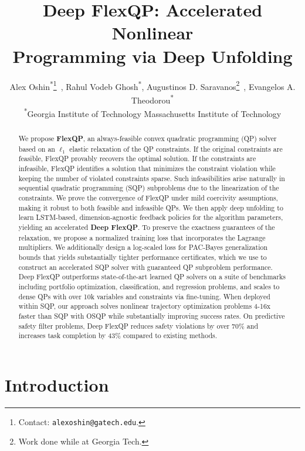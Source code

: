 \documentclass{article} %
\title{Deep FlexQP: Accelerated Nonlinear\\Programming via Deep Unfolding}
\author{Alex Oshin\textsuperscript{*}\setcounter{footnote}{2}\thanks{Contact: \texttt{alexoshin@gatech.edu}.}\ , Rahul Vodeb Ghosh\textsuperscript{*}, Augustinos D. Saravanos\textsuperscript{\textdagger}\thanks{Work done while at Georgia Tech.}\ , Evangelos A. Theodorou\textsuperscript{*} \\
\textsuperscript{*}Georgia Institute of Technology \hspace{2em} \textsuperscript{\textdagger}Massachusetts Institute of Technology
}
\begin{document}
\maketitle

\begin{abstract}
We propose \textbf{FlexQP}, an always-feasible convex quadratic programming (QP) solver based on an $\ell_1$ elastic relaxation of the QP constraints.
If the original constraints are feasible, FlexQP provably recovers the optimal solution.
If the constraints are infeasible, FlexQP identifies a solution that minimizes the constraint violation while keeping the number of violated constraints sparse.
Such infeasibilities arise naturally in sequential quadratic programming (SQP) subproblems due to the linearization of the constraints.
We prove the convergence of FlexQP under mild coercivity assumptions, making it robust to both feasible and infeasible QPs.
We then apply deep unfolding to learn LSTM-based, dimension-agnostic feedback policies for the algorithm parameters, yielding an accelerated \textbf{Deep FlexQP}.
To preserve the exactness guarantees of the relaxation, we propose a normalized training loss that incorporates the Lagrange multipliers.
We additionally design a log-scaled loss for PAC-Bayes generalization bounds that yields substantially tighter performance certificates, which we use to construct an accelerated SQP solver with guaranteed QP subproblem performance.
Deep FlexQP outperforms state-of-the-art learned QP solvers on a suite of benchmarks including portfolio optimization, classification, and regression problems, and scales to dense QPs with over 10k variables and constraints via fine-tuning.
When deployed within SQP, our approach solves nonlinear trajectory optimization problems 4-16x faster than SQP with OSQP while substantially improving success rates.
On predictive safety filter problems, Deep FlexQP reduces safety violations by over 70\% and increases task completion by 43\% compared to existing methods.
\end{abstract}

\section{Introduction}
\label{sec:intro}
\end{document}
